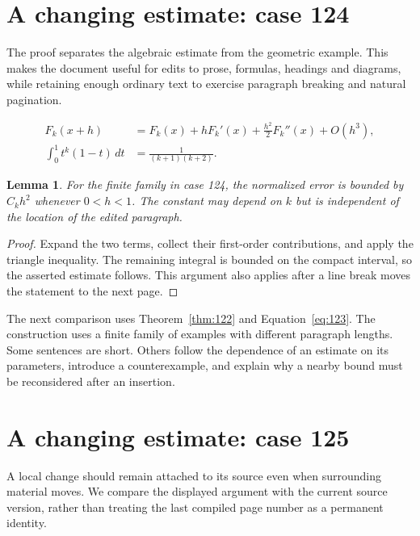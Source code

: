 \documentclass[a4paper,10pt]{article}
\newtheorem{lemma}[theorem]{Lemma}
\begin{document}
\lipsum[13]

\section{A changing estimate: case 124}\label{unit:123}
The proof separates the algebraic estimate from the geometric example. This makes the document useful for edits to prose, formulas, headings and diagrams, while retaining enough ordinary text to exercise paragraph breaking and natural pagination.

\lipsum[10-11]
\begin{align}\label{eq:123}
 F_k(x+h)&=F_k(x)+hF_k'(x)+\frac{h^2}{2}F_k''(x)+O(h^3),\\
 \int_0^1 t^k(1-t)\,dt&=\frac{1}{(k+1)(k+2)}.
\end{align}
\begin{lemma}\label{thm:123}
For the finite family in case 124, the normalized error is bounded by $C_k h^2$ whenever $0<h<1$. The constant may depend on $k$ but is independent of the location of the edited paragraph.
\end{lemma}
\begin{proof}
Expand the two terms, collect their first-order contributions, and apply the
triangle inequality. The remaining integral is bounded on the compact interval,
so the asserted estimate follows. This argument also applies after a line break
moves the statement to the next page.
\end{proof}
\begin{center}
\end{center}
The next comparison uses Theorem~\ref{thm:122} and Equation~\ref{eq:123}. The construction uses a finite family of examples with different paragraph lengths. Some sentences are short. Others follow the dependence of an estimate on its parameters, introduce a counterexample, and explain why a nearby bound must be reconsidered after an insertion.

\lipsum[18]

\section{A changing estimate: case 125}\label{unit:124}
A local change should remain attached to its source even when surrounding material moves. We compare the displayed argument with the current source version, rather than treating the last compiled page number as a permanent identity.
\end{document}
